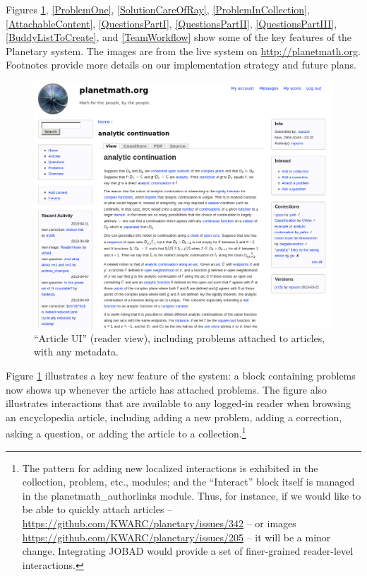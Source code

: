 
Figures \ref{ReaderView}, \ref{ProblemOne}, \ref{SolutionCareOfRay},
\ref{ProblemInCollection}, \ref{AttachableContent},
\ref{QuestionsPartI}, \ref{QuestionsPartII}, \ref{QuestionsPartIII},
\ref{BuddyListToCreate}, 
and \ref{TeamWorkflow}
show some of the key features of the Planetary system. The images are from the live system on \url{http://planetmath.org}. Footnotes provide more details on our implementation strategy and future plans.

\FloatBarrier

\begin{vplace}[0.7]
\begin{figure}[h]
\begin{center}
\includegraphics[width=.85\textwidth]{./inputs/ReaderView.png}
\end{center}
\caption{``Article UI'' (reader view), including problems attached to
  articles, with any metadata. \label{ReaderView}}
\end{figure}
\bigskip

Figure \ref{ReaderView} illustrates a key new feature of the system:
a block containing problems now shows up whenever the article has
attached problems.  The figure also illustrates interactions that are
available to any logged-in reader when browsing an encyclopedia
article, including adding a new problem, adding a correction, asking a
question, or adding the article to a collection.\footnote{The pattern
  for adding new localized interactions is exhibited in the {\sfdefault
    collection}, {\sfdefault problem}, etc., modules; and the ``Interact''
  block itself is managed in the {\sfdefault planetmath\_authorlinks}
  module. Thus, for instance, if we would like to be able to quickly
  attach articles --
  \url{https://github.com/KWARC/planetary/issues/342} -- or images
  \url{https://github.com/KWARC/planetary/issues/205} -- it will be a
  minor change.  Integrating JOBAD would provide a set of finer-grained
  reader-level interactions.}

\end{vplace}

